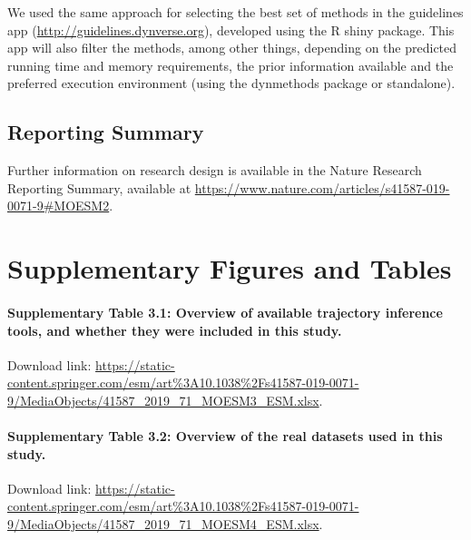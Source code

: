 We used the same approach for selecting the best set of methods in the guidelines app (\href{http://guidelines.dynverse.org}{http://guidelines.dynverse.org}), developed using the R shiny package. This app will also filter the methods, among other things, depending on the predicted running time and memory requirements, the prior information available and the preferred execution environment (using the dynmethods package or standalone).

\subsection{Reporting Summary}

Further information on research design is available in the Nature Research Reporting Summary, available at \href{https://www.nature.com/articles/s41587-019-0071-9\#MOESM2}{https://www.nature.com/articles/s41587-019-0071-9\#MOESM2}.


\section{Supplementary Figures and Tables}

\paragraph{Supplementary Table 3.1: Overview of available trajectory inference tools, and whether they were included in	this study.} \label{tab:supptable_1}
Download link: \url{https://static-content.springer.com/esm/art\%3A10.1038\%2Fs41587-019-0071-9/MediaObjects/41587\_2019\_71\_MOESM3\_ESM.xlsx}.

\paragraph{Supplementary Table 3.2: Overview of the real datasets used in this study.} \label{tab:supptable_2}
Download link:
\url{https://static-content.springer.com/esm/art\%3A10.1038\%2Fs41587-019-0071-9/MediaObjects/41587\_2019\_71\_MOESM4\_ESM.xlsx}.


